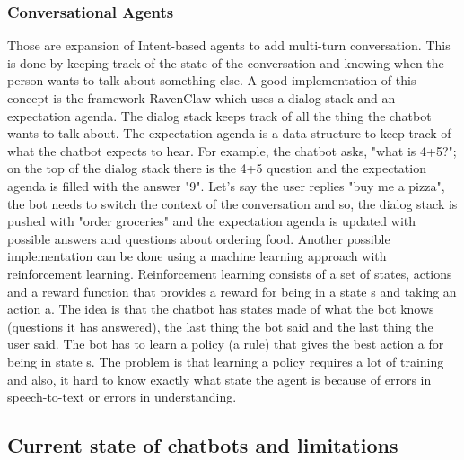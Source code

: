 \documentclass[b5paper,10pt,twoside,cucitura]{toptesi}
\begin{document}
\subsubsection{Conversational Agents}

Those are expansion of Intent-based agents to add multi-turn conversation. This is done by keeping track of the state of the conversation and knowing when the person wants to talk about something else. A good implementation of this concept is the framework RavenClaw  \citep{ravenclaw} which uses a dialog stack and an expectation agenda. The dialog stack keeps track of all the thing the chatbot wants to talk about. The expectation agenda is a data structure to keep track of what the chatbot expects to hear.
For example, the chatbot asks, "what is 4+5?"; on the top of the dialog stack there is the 4+5 question and the expectation agenda is filled with the answer "9". Let's say the user replies "buy me a pizza", the bot needs to switch the context of the conversation and so, the dialog stack is pushed with "order groceries" and the expectation agenda is updated with possible answers and questions about ordering food.
Another possible implementation can be done using a machine learning approach with reinforcement learning. Reinforcement learning consists of a set of states, actions and a reward function that provides a reward for being in a state s and taking an action a. The idea is that the chatbot has states made of what the bot knows (questions it has answered), the last thing the bot said and the last thing the user said. The bot has to learn a policy (a rule) that gives the best action a for being in state s. 
The problem is that learning a policy requires a lot of training and also, it hard to know exactly what state the agent is because of errors in speech-to-text or errors in understanding.


\subsection{Current state of chatbots and limitations}
\end{document}
